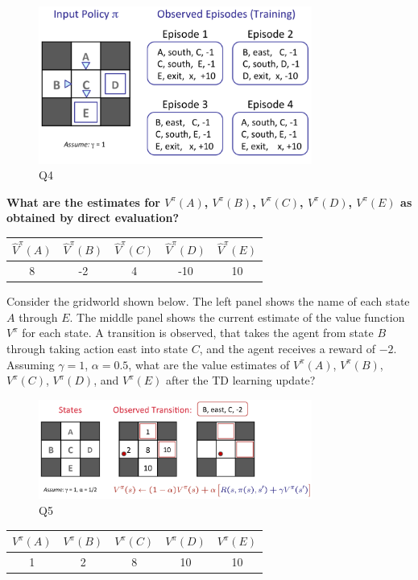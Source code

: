\documentclass{homework}
\begin{document}
\clearpage
\exercise[4]
\begin{figure}[h!]
    \centering
    \includegraphics[width=0.8\textwidth]{figures/q3.png}
    \caption{Q4}
    \label{fig:q4}
\end{figure}
\textbf{\large What are the estimates for $V^{\pi}(A)$, $V^{\pi}(B)$, $V^{\pi}(C)$, $V^{\pi}(D)$, $V^{\pi}(E)$ as obtained by direct evaluation?}

\begin{table}[h!]
    \centering
    \begin{tabular}{c|c|c|c|c}
        \toprule
        $\hat{V}^{\pi}(A)$ & $\hat{V}^{\pi}(B)$ & $\hat{V}^{\pi}(C)$ & $\hat{V}^{\pi}(D)$ & $\hat{V}^{\pi}(E)$ \\
        \midrule
        8 & -2 & 4 & -10 & 10\\
        \bottomrule
    \end{tabular}
\end{table}

\clearpage
\exercise[5]
Consider the gridworld shown below. The left panel shows the name of each state $A$ through $E$. The middle panel shows the current estimate of the value function $V^{\pi}$ for each state. A transition is observed, that takes the agent from state $B$ through taking action east into state $C$, and the agent receives a reward of $-2$. Assuming $\gamma = 1$, $\alpha = 0.5$, what are the value estimates of $V^{\pi}(A)$, $V^{\pi}(B)$, $V^{\pi}(C)$, $V^{\pi}(D)$, and $V^{\pi}(E)$ after the TD learning update?
\begin{figure}[h!]
    \centering
    \includegraphics[width=0.8\textwidth]{figures/q5.png}
    \caption{Q5}
    \label{fig:q5}
\end{figure}
\begin{table}[h!]
    \centering
    \begin{tabular}{c|c|c|c|c}
        \toprule
        $V^{\pi}(A)$ & $V^{\pi}(B)$ & $V^{\pi}(C)$ & $V^{\pi}(D)$ & $V^{\pi}(E)$ \\
        \midrule
        1 & 2 & 8 & 10 & 10\\
        \bottomrule
    \end{tabular}
\end{table}
\end{document}

